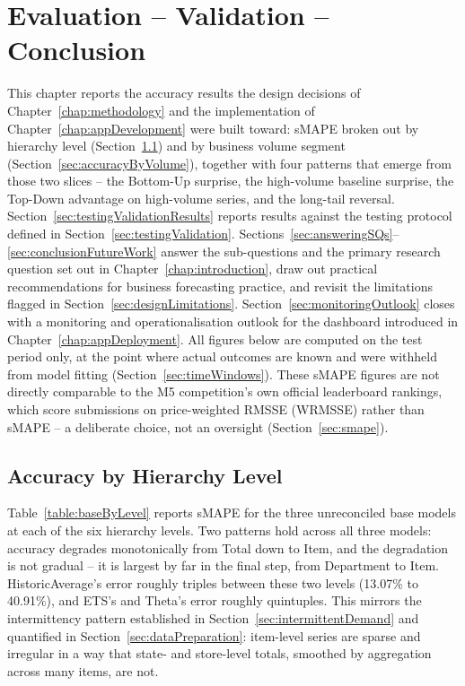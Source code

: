%
%
%

\chapter{Evaluation -- Validation -- Conclusion}
\label{chap:evaluation}

This chapter reports the accuracy results the design decisions of Chapter~\ref{chap:methodology} and the implementation of Chapter~\ref{chap:appDevelopment} were built toward: sMAPE broken out by hierarchy level (Section~\ref{sec:accuracyByLevel}) and by business volume segment (Section~\ref{sec:accuracyByVolume}), together with four patterns that emerge from those two slices -- the Bottom-Up surprise, the high-volume baseline surprise, the Top-Down advantage on high-volume series, and the long-tail reversal. Section~\ref{sec:testingValidationResults} reports results against the testing protocol defined in Section~\ref{sec:testingValidation}. Sections~\ref{sec:answeringSQs}--\ref{sec:conclusionFutureWork} answer the sub-questions and the primary research question set out in Chapter~\ref{chap:introduction}, draw out practical recommendations for business forecasting practice, and revisit the limitations flagged in Section~\ref{sec:designLimitations}. Section~\ref{sec:monitoringOutlook} closes with a monitoring and operationalisation outlook for the dashboard introduced in Chapter~\ref{chap:appDeployment}. All figures below are computed on the test period only, at the point where actual outcomes are known and were withheld from model fitting (Section~\ref{sec:timeWindows}). These sMAPE figures are not directly comparable to the M5 competition's own official leaderboard rankings, which score submissions on price-weighted RMSSE (WRMSSE) rather than sMAPE -- a deliberate choice, not an oversight (Section~\ref{sec:smape}).

\section{Accuracy by Hierarchy Level}
\label{sec:accuracyByLevel}

Table~\ref{table:baseByLevel} reports sMAPE for the three unreconciled base models at each of the six hierarchy levels. Two patterns hold across all three models: accuracy degrades monotonically from Total down to Item, and the degradation is not gradual -- it is largest by far in the final step, from Department to Item. HistoricAverage's error roughly triples between these two levels (13.07\% to 40.91\%), and ETS's and Theta's error roughly quintuples. This mirrors the intermittency pattern established in Section~\ref{sec:intermittentDemand} and quantified in Section~\ref{sec:dataPreparation}: item-level series are sparse and irregular in a way that state- and store-level totals, smoothed by aggregation across many items, are not.

